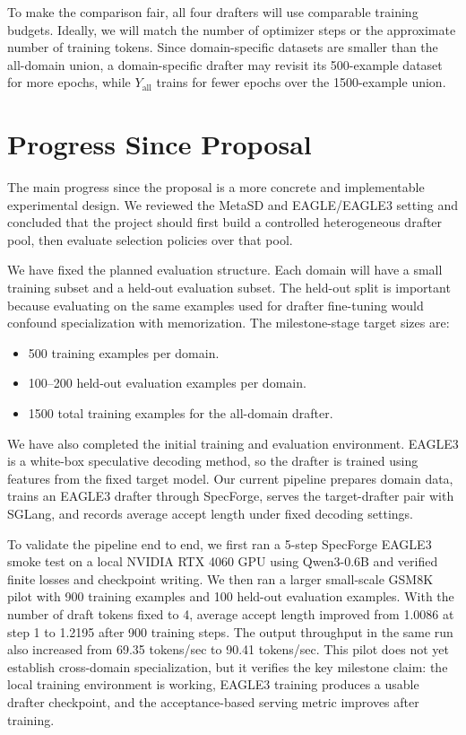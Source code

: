 \documentclass[11pt]{article}
\begin{document}
To make the comparison fair, all four drafters will use comparable training budgets. Ideally, we will match the number of optimizer steps or the approximate number of training tokens. Since domain-specific datasets are smaller than the all-domain union, a domain-specific drafter may revisit its 500-example dataset for more epochs, while $Y_{\mathrm{all}}$ trains for fewer epochs over the 1500-example union.

\section{Progress Since Proposal}

The main progress since the proposal is a more concrete and implementable experimental design. We reviewed the MetaSD and EAGLE/EAGLE3 setting and concluded that the project should first build a controlled heterogeneous drafter pool, then evaluate selection policies over that pool.

We have fixed the planned evaluation structure. Each domain will have a small training subset and a held-out evaluation subset. The held-out split is important because evaluating on the same examples used for drafter fine-tuning would confound specialization with memorization. The milestone-stage target sizes are:
\begin{itemize}
    \item 500 training examples per domain.
    \item 100--200 held-out evaluation examples per domain.
    \item 1500 total training examples for the all-domain drafter.
\end{itemize}

We have also completed the initial training and evaluation environment. EAGLE3 is a white-box speculative decoding method, so the drafter is trained using features from the fixed target model. Our current pipeline prepares domain data, trains an EAGLE3 drafter through SpecForge, serves the target-drafter pair with SGLang, and records average accept length under fixed decoding settings.

To validate the pipeline end to end, we first ran a 5-step SpecForge EAGLE3 smoke test on a local NVIDIA RTX 4060 GPU using Qwen3-0.6B and verified finite losses and checkpoint writing. We then ran a larger small-scale GSM8K pilot with 900 training examples and 100 held-out evaluation examples. With the number of draft tokens fixed to 4, average accept length improved from 1.0086 at step 1 to 1.2195 after 900 training steps. The output throughput in the same run also increased from 69.35 tokens/sec to 90.41 tokens/sec. This pilot does not yet establish cross-domain specialization, but it verifies the key milestone claim: the local training environment is working, EAGLE3 training produces a usable drafter checkpoint, and the acceptance-based serving metric improves after training.
\end{document}
